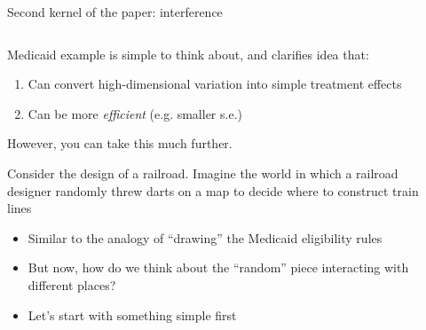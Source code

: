 \documentclass[notes,11pt, aspectratio=169]{beamer}
\newenvironment{wideitemize}{\itemize\addtolength{\itemsep}{10pt}}{\enditemize}
\begin{document}
\begin{frame}{Second kernel of the paper: interference}
\begin{columns}[T] %
\begin{column}{.75\textwidth}
  \begin{wideitemize}

  \item Medicaid example is simple to think about, and clarifies idea that:
    \begin{enumerate}
    \item Can convert high-dimensional variation into simple treatment effects
    \item Can be more \emph{efficient} (e.g. smaller s.e.) 
    \end{enumerate}
  \item However, you can take this much further.
  \item Consider the design of a railroad. Imagine the world in which
    a railroad designer randomly threw darts on a map to decide where
    to construct train lines
    \begin{itemize}
    \item Similar to the analogy of ``drawing'' the Medicaid
      eligibility rules
    \item But now, how do we think about the ``random'' piece
      interacting with different places?
    \item Let's start with something simple first
    \end{itemize}
  \end{wideitemize}
\end{column}%
\hfill%
\begin{column}{.25\textwidth}
\end{column}%
\end{columns}
\end{frame}
\end{document}
